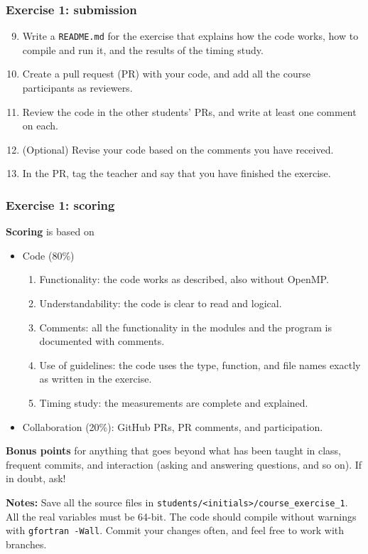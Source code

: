 \begin{frame}
  \frametitle{Exercise 1: submission}
  \begin{enumerate}
    \setcounter{enumi}{8}
    \item Write a \texttt{README.md} for the exercise that explains how the code works, how to compile and run it, and the results of the timing study.
    \item Create a pull request (PR) with your code, and add all the course participants as reviewers.
    \item Review the code in the other students' PRs, and write at least one comment on each.
    \item (Optional) Revise your code based on the comments you have received.
    \item In the PR, tag the teacher and say that you have finished the exercise.
  \end{enumerate}
\end{frame}


\begin{frame}
  \frametitle{Exercise 1: scoring}
  \textbf{Scoring} is based on
  \begin{itemize}
    \item Code (80\%)
      \begin{enumerate}
        \item Functionality: the code works as described, also without OpenMP.
        \item Understandability: the code is clear to read and logical.
        \item Comments: all the functionality in the modules and the program is documented with comments.
        \item Use of guidelines: the code uses the type, function, and file names exactly as written in the exercise.
        \item Timing study: the measurements are complete and explained.
      \end{enumerate}
    \item Collaboration (20\%): GitHub PRs, PR comments, and participation.
  \end{itemize}

  \textbf{Bonus points} for anything that goes beyond what has been taught in class, frequent commits, and interaction (asking and answering questions, and so on). If in doubt, ask!

  \vspace*{2mm}
  \textbf{Notes:} Save all the source files in \texttt{students/<initials>/course\_exercise\_1}. All the real variables must be 64-bit. The code should compile without warnings with \texttt{gfortran -Wall}. Commit your changes often, and feel free to work with branches.
\end{frame}



